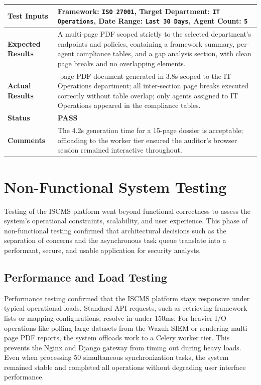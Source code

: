 \begin{table}[H]
{\begin{tabular}{|>{\raggedright\arraybackslash\bfseries}p{4.5cm}|>{\raggedright\arraybackslash}p{11.5cm}|}
        Test Inputs & Framework: \texttt{ISO 27001}, Target Department: \texttt{IT Operations}, Date Range: \texttt{Last 30 Days}, Agent Count: \texttt{5} \\ \hline
        Expected Results & A multi-page PDF scoped strictly to the selected department's endpoints and policies, containing a framework summary, per-agent compliance tables, and a gap analysis section, with clean page breaks and no overlapping elements. \\ \hline
        Actual Results & 12-page PDF document generated in 3.8s scoped to the IT Operations department; all inter-section page breaks executed correctly without table overlap; only agents assigned to IT Operations appeared in the compliance tables. \\ \hline
        Status & \textcolor{green!60!black}{\textbf{PASS}} \\ \hline
        Comments & The 4.2s generation time for a 15-page dossier is acceptable; offloading to the worker tier ensured the auditor's browser session remained interactive throughout. \\ \hline
    \end{tabular}
    }
\end{table}

\section{Non-Functional System Testing}
Testing of the ISCMS platform went beyond functional correctness to assess the system's operational constraints, scalability, and user experience. This phase of non-functional testing confirmed that architectural decisions such as the separation of concerns and the asynchronous task queue translate into a performant, secure, and usable application for security analysts.

\subsection{Performance and Load Testing}
Performance testing confirmed that the ISCMS platform stays responsive under typical operational loads. Standard API requests, such as retrieving framework lists or mapping configurations, resolve in under 150ms. For heavier I/O operations like polling large datasets from the Wazuh SIEM or rendering multi-page PDF reports, the system offloads work to a Celery worker tier. This prevents the Nginx and Django gateway from timing out during heavy loads. Even when processing 50 simultaneous synchronization tasks, the system remained stable and completed all operations without degrading user interface performance.

